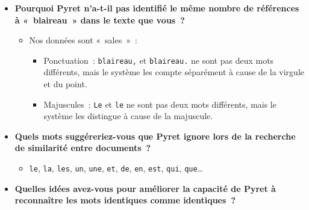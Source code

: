 \documentclass[12pt,a4paper]{article}
\begin{document}
\begin{thinkbox}
  \begin{itemize}
    \item \textbf{Pourquoi Pyret n'a-t-il pas identifié le même nombre de références à «~blaireau~» dans le texte que vous~?}
    \begin{itemize}
      \item Nos données sont «~sales~»~:
      \begin{itemize}
        \item Ponctuation~: \texttt{blaireau,} et \texttt{blaireau.} ne sont pas deux mots différents, mais le système les compte séparément à cause de la virgule et du point.
        \item Majuscules~: \texttt{Le} et \texttt{le} ne sont pas deux mots différents, mais le système les distingue à cause de la majuscule.
      \end{itemize}
    \end{itemize}
    \item \textbf{Quels mots suggéreriez-vous que Pyret ignore lors de la recherche de similarité entre documents~?}
    \begin{itemize}
      \item \texttt{le}, \texttt{la}, \texttt{les}, \texttt{un}, \texttt{une}, \texttt{et}, \texttt{de}, \texttt{en}, \texttt{est}, \texttt{qui}, \texttt{que}…
    \end{itemize}
    \item \textbf{Quelles idées avez-vous pour améliorer la capacité de Pyret à reconnaître les mots identiques comme identiques~?}
  \end{itemize}
\end{thinkbox}
\end{document}
